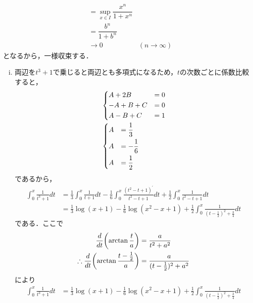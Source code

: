 \begin{enumerate}[(1)]
\begin{enumerate}[(i)]
\begin{itemize}
\begin{itemize}
\begin{align}
                    &=\sup_{x\in I}\dfrac{x^n}{1+x^n}\\
                    &=\dfrac{b^n}{1+b^n}\\
                    &\to 0& (n\to\infty)
                \end{align}
                となるから，一様収束する．
            \end{itemize}
        \end{itemize}
    \end{enumerate}
    \begin{enumerate}[(i)]
        \item 両辺を$t^3+1$で乗じると両辺とも多項式になるため，$t$の次数ごとに係数比較すると，
        \begin{align}
            &\begin{dcases}
                A+2B&=0\\
                -A+B+C&=0\\
                A-B+C&=1
            \end{dcases}
            \\
            &\begin{dcases}
                A&=\frac{1}{3}\\
                A&=-\frac{1}{6}\\
                A&=\frac{1}{2}
            \end{dcases}
        \end{align}
        であるから，
        \begin{align}
            \int_0^x\frac{1}{t^3+1}dt
            &=\frac{1}{3}\int_0^x \frac{1}{t+1} dt
            -\frac{1}{6}\int_0^x \frac{(t^2-t+1)^\prime}{t^2-t+1} dt
            +\frac{1}{2}\int_0^x \frac{1}{t^2-t+1} dt\\
            &=\frac{1}{3}\log(x+1)
            -\frac{1}{6}\log(x^2-x+1)
            +\frac{1}{2}\int_0^x \frac{1}{(t-\frac{1}{2})^2+\frac{3}{4}} dt
        \end{align}
        である．ここで
        \begin{align}
            \dv{t}(\arctan\frac{t}{a})&=\frac{a}{t^2+a^2}\\
            \therefore \dv{t}(\arctan\frac{t-\frac{1}{2}}{a})&=\frac{a}{(t-\frac{1}{2})^2+a^2}
        \end{align}
        により
        \begin{align}
            \int_0^x\frac{1}{t^3+1}dt
            &=\frac{1}{3}\log(x+1)
            -\frac{1}{6}\log(x^2-x+1)
            +\frac{1}{2}\int_0^x \frac{1}{(t-\frac{1}{2})^2+\frac{3}{4}} dt\\

\end{align}
\end{enumerate}
\end{enumerate}
